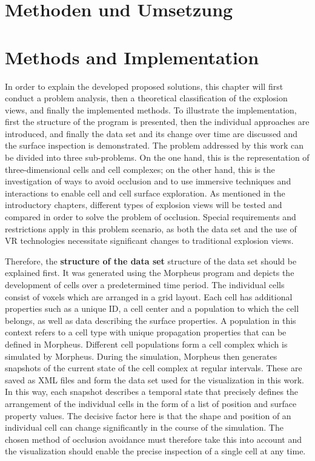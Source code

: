 {\chapter{Methoden und Umsetzung}}
{\chapter{Methods and Implementation}}
\label{sec:methods}


In order to explain the developed proposed solutions, this chapter will first conduct a problem analysis, then a theoretical classification of the explosion views, and finally the implemented methods. 
To illustrate the implementation, first the structure of the program is presented, then the individual approaches are introduced, and finally the data set and its change over time are discussed and the surface inspection is demonstrated. %
The problem addressed by this work can be divided into three sub-problems. On the one hand, this is the representation of three-dimensional cells and cell complexes; on the other hand, this is the investigation of ways to avoid occlusion and to use immersive techniques and interactions to enable cell and cell surface exploration.
As mentioned in the introductory chapters, different types of explosion views will be tested and compared in order to solve the problem of occlusion.
Special requirements and restrictions apply in this problem scenario, as both the data set and the use of VR technologies necessitate significant changes to traditional explosion views.

Therefore, the \textbf{structure of the data set }structure of the data set should be explained first. %
It was generated using the Morpheus program and depicts the development of cells over a predetermined time period.
The individual cells consist of voxels which are arranged in a grid layout. Each cell has additional properties such as a unique ID, a cell center and a population to which the cell belongs, as well as data describing the surface properties. 
A population in this context refers to a cell type with unique propagation properties that can be defined in Morpheus.
Different cell populations form a cell complex which is simulated by Morpheus. 
During the simulation, Morpheus then generates snapshots of the current state of the cell complex at regular intervals. 
These are saved as XML files and form the data set used for the visualization in this work. 
In this way, each snapshot describes a temporal state that precisely defines the arrangement of the individual cells in the form of a list of position and surface property values.
The decisive factor here is that the shape and position of an individual cell can change significantly in the course of the simulation. 
The chosen method of occlusion avoidance must therefore take this into account and the visualization should enable the precise inspection of a single cell at any time.

